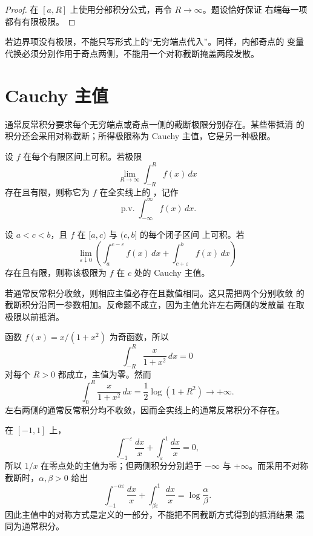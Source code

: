 \begin{proof}
在 \([a,R]\) 上使用分部积分公式，再令 \(R\to\infty\)。题设恰好保证
右端每一项都有有限极限。
\end{proof}

若边界项没有极限，不能只写形式上的“无穷端点代入”。同样，内部奇点的
变量代换必须分别作用于奇点两侧，不能用一个对称截断掩盖两段发散。

\section{Cauchy 主值}

通常反常积分要求每个无穷端点或奇点一侧的截断极限分别存在。某些带抵消
的积分还会采用对称截断；所得极限称为 Cauchy 主值，它是另一种极限。

\begin{definition}
设 \(f\) 在每个有限区间上可积。若极限
\[
 \lim_{R\to\infty}\int_{-R}^{R}f(x)\,dx
\]
存在且有限，则称它为 \(f\) 在全实线上的 ，记作
\[
 \operatorname{p.v.}\!\int_{-\infty}^{\infty}f(x)\,dx.
\]
\end{definition}

\begin{definition}
设 \(a<c<b\)，且 \(f\) 在 \([a,c)\) 与 \((c,b]\) 的每个闭子区间
上可积。若
\[
 \lim_{\varepsilon\downarrow0}
 \left(\int_a^{c-\varepsilon}f(x)\,dx
       +\int_{c+\varepsilon}^b f(x)\,dx\right)
\]
存在且有限，则称该极限为 \(f\) 在 \(c\) 处的 Cauchy 主值。
\end{definition}

若通常反常积分收敛，则相应主值必存在且数值相同。这只需把两个分别收敛
的截断积分沿同一参数相加。反命题不成立，因为主值允许左右两侧的发散量
在取极限以前抵消。

\begin{example}[无穷远处的对称抵消]
函数 \(f(x)=x/(1+x^2)\) 为奇函数，所以
\[
 \int_{-R}^{R}\frac{x}{1+x^2}\,dx=0
\]
对每个 \(R>0\) 都成立，主值为零。然而
\[
 \int_0^R\frac{x}{1+x^2}\,dx=\frac12\log(1+R^2)\longrightarrow+\infty.
\]
左右两侧的通常反常积分均不收敛，因而全实线上的通常反常积分不存在。
\end{example}

\begin{example}[内部奇点与截断方式]
在 \([-1,1]\) 上，
\[
 \int_{-1}^{-\varepsilon}\frac{dx}{x}
 +\int_{\varepsilon}^{1}\frac{dx}{x}=0,
\]
所以 \(1/x\) 在零点处的主值为零；但两侧积分分别趋于
\(-\infty\) 与 \(+\infty\)。而采用不对称截断时，\(\alpha,\beta>0\)
给出
\[
 \int_{-1}^{-\alpha\varepsilon}\frac{dx}{x}
 +\int_{\beta\varepsilon}^{1}\frac{dx}{x}
 =\log\frac{\alpha}{\beta}.
\]
因此主值中的对称方式是定义的一部分，不能把不同截断方式得到的抵消结果
混同为通常积分。
\end{example}

